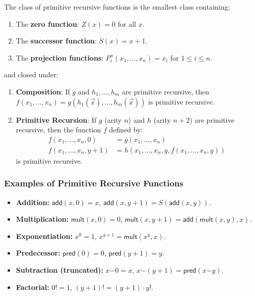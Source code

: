 \begin{definition}
The class of primitive recursive functions is the smallest class containing:
\begin{enumerate}
\item The \textbf{zero function}: $Z(x) = 0$ for all $x$.
\item The \textbf{successor function}: $S(x) = x+1$.
\item The \textbf{projection functions}: $P_i^n(x_1, \dots, x_n) = x_i$ for $1 \le i \le n$.
\end{enumerate}
and closed under:
\begin{enumerate}
\item[4.] \textbf{Composition}: If $g$ and $h_1, \dots, h_m$ are primitive recursive, then $f(x_1, \dots, x_n) = g(h_1(\vec{x}), \dots, h_m(\vec{x}))$ is primitive recursive.
\item[5.] \textbf{Primitive Recursion}: If $g$ (arity $n$) and $h$ (arity $n+2$) are primitive recursive, then the function $f$ defined by:
\[
\begin{aligned}
f(x_1, \dots, x_n, 0) &= g(x_1, \dots, x_n) \\
f(x_1, \dots, x_n, y+1) &= h(x_1, \dots, x_n, y, f(x_1, \dots, x_n, y))
\end{aligned}
\]
is primitive recursive.
\end{enumerate}
\end{definition}

\subsubsection*{Examples of Primitive Recursive Functions}

\begin{itemize}
\item \textbf{Addition:} $\mathsf{add}(x, 0) = x$, $\mathsf{add}(x, y+1) = S(\mathsf{add}(x, y))$.
\item \textbf{Multiplication:} $\mathsf{mult}(x, 0) = 0$, $\mathsf{mult}(x, y+1) = \mathsf{add}(\mathsf{mult}(x, y), x)$.
\item \textbf{Exponentiation:} $x^0 = 1$, $x^{y+1} = \mathsf{mult}(x^y, x)$.
\item \textbf{Predecessor:} $\mathsf{pred}(0) = 0$, $\mathsf{pred}(y+1) = y$.
\item \textbf{Subtraction (truncated):} $x \dot- 0 = x$, $x \dot- (y+1) = \mathsf{pred}(x \dot- y)$.
\item \textbf{Factorial:} $0! = 1$, $(y+1)! = (y+1) \cdot y!$.
\end{itemize}

